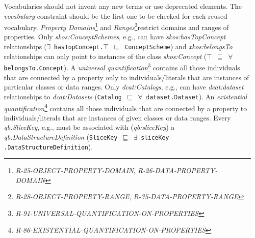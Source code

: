 \documentclass{llncs}
\newcommand{\ms}[1]{\texttt{#1}}
\begin{document}
Vocabularies should not invent any new terms or use deprecated elements.
The \emph{vocabulary} constraint should be the first one to be checked for each reused vocabulary.
\emph{Property Domains}\footnote{\emph{R-25-OBJECT-PROPERTY-DOMAIN}, \emph{R-26-DATA-PROPERTY-DOMAIN}} and \emph{Ranges}\footnote{\emph{R-28-OBJECT-PROPERTY-RANGE}, \emph{R-35-DATA-PROPERTY-RANGE}}restrict domains and ranges of properties.
Only \emph{skos:ConceptSchemes}, e.g., can have \emph{skos:hasTopConcept} relationships (\ms{$\exists$ hasTopConcept.$\top$ $\sqsubseteq$ ConceptScheme}) and
\emph{xkos:belongsTo} relationships can only point to instances of the class \emph{skos:Concept} (\ms{$\top$ $\sqsubseteq$ $\forall$ belongsTo.Concept}).
A \emph{universal quantification}\footnote{\emph{R-91-UNIVERSAL-QUANTIFICATION-ON-PROPERTIES}} contains all those individuals that are connected by a property only to individuals/literals that are instances of particular classes  or data ranges.
Only \emph{dcat:Catalogs}, e.g., can have \emph{dcat:dataset} relationships to \emph{dcat:Datasets} (\ms{Catalog $\sqsubseteq$ $\forall$ dataset.Dataset}).
An \emph{existential quantification}\footnote{\emph{R-86-EXISTENTIAL-QUANTIFICATION-ON-PROPERTIES}} contains all those individuals that are connected by a property to individuals/literals that are instances of given classes or data ranges.
Every \emph{qb:SliceKey}, e.g., must be associated with (\emph{qb:sliceKey}) a \emph{qb:DataStructureDefinition} (\ms{SliceKey $\sqsubseteq$ $\exists$ sliceKey$^{-}$.DataStructureDefinition}).
\end{document}
